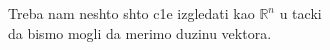 \documentclass[preview]{standalone}
\begin{document}
\begin{center}
Treba nam neshto shto c1e izgledati kao \(\mathbb{R}^n\) u tacki\\
        da bismo mogli da merimo duzinu vektora.
\end{center}
\end{document}
